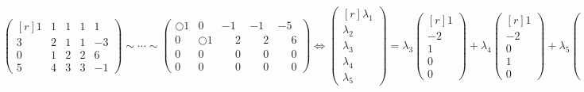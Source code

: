 \[
  \begin{pmatrix*}[r]
    1 & 1 & 1 & 1 & 1  \\
    3 & 2 & 1 & 1 & -3 \\
    0 & 1 & 2 & 2 & 6 \\
    5 & 4 & 3 & 3 & -1
  \end{pmatrix*} \sim \cdots \sim
  \begin{pmatrix*}
    \Circle{1} & 0 & -1 & -1 & -5 \\
    0 & \Circle{1} & \phantom{-}2 & \phantom{-}2 & \phantom{-}6 \\
    0 & 0 & \phantom{-}0 & \phantom{-}0 & \phantom{-}0 \\
    0 & 0 & \phantom{-}0 & \phantom{-}0 & \phantom{-}0 
  \end{pmatrix*} \Leftrightarrow 
  \begin{pmatrix*}[r] \lambda _{1} \\ \lambda _{2} \\ \lambda _{3} \\ \lambda _{4} \\
  \lambda _{5}  \end{pmatrix*} = \lambda _{3} 
  \begin{pmatrix*}[r] 1 \\ -2 \\ 1 \\ 0 \\ 0  \end{pmatrix*} + \lambda _{4} 
  \begin{pmatrix*}[r] 1 \\ -2 \\ 0 \\ 1 \\ 0  \end{pmatrix*} + \lambda _{5} 
  \begin{pmatrix*}[r] 5 \\ -6 \\ 0 \\ 0 \\ 1  \end{pmatrix*}
\] 



